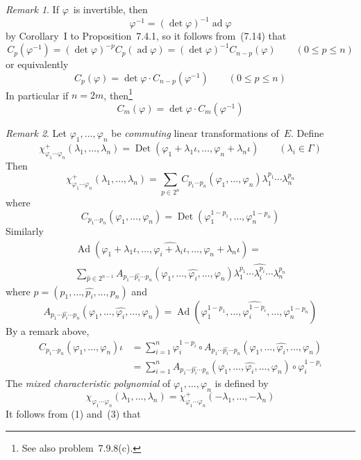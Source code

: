 \documentclass[letterpaper,12pt]{article}
\DeclareMathOperator{\ad}{ad}
\DeclareMathOperator{\Ad}{Ad}
\DeclareMathOperator{\Det}{Det}
\newcommand{\after}{\circ}
\newcommand{\mult}{\cdot}
\newcommand{\delete}{\widehat}
\theoremstyle{definition}
\theoremstyle{remark}
\newtheorem*{rmk}{Remark}
\begin{document}
\begin{rmk}
If \(\varphi\)~is invertible, then
\[\varphi^{-1}=(\det\varphi)^{-1}\ad\varphi\]
by Corollary~I to Proposition~7.4.1, so it follows from~(7.14) that
\[C_p(\varphi^{-1})=(\det\varphi)^{-p}C_p(\ad\varphi)=(\det\varphi)^{-1}C_{n-p}(\varphi)\qquad(0\le p\le n)\]
or equivalently
\[C_p(\varphi)=\det\varphi\mult C_{n-p}(\varphi^{-1})\qquad(0\le p\le n)\]
In particular if \(n=2m\), then\footnote{See also problem~7.9.8(c).}
\[C_m(\varphi)=\det\varphi\mult C_m(\varphi^{-1})\]
\end{rmk}

\begin{rmk}
Let \(\varphi_1,\ldots,\varphi_n\) be \emph{commuting} linear transformations of~\(E\). Define
\[\chi^+_{\varphi_1\cdots\varphi_n}(\lambda_1,\ldots,\lambda_n)=\Det(\varphi_1+\lambda_1\iota,\ldots,\varphi_n+\lambda_n\iota)\qquad(\lambda_i\in\Gamma)\]
Then
\[\chi^+_{\varphi_1\cdots\varphi_n}(\lambda_1,\ldots,\lambda_n)=\sum_{p\in 2^n}C_{p_1\cdots p_n}(\varphi_1,\ldots,\varphi_n)\lambda_1^{p_1}\cdots\lambda_n^{p_n}\tag{1}\]
where
\[C_{p_1\cdots p_n}(\varphi_1,\ldots,\varphi_n)=\Det(\varphi_1^{1-p_1},\ldots,\varphi_n^{1-p_n})\]
Similarly
\begin{multline*}
\Ad(\varphi_1+\lambda_1\iota,\ldots,\delete{\varphi_i+\lambda_i\iota},\ldots,\varphi_n+\lambda_n\iota)=\\
\sum_{\delete{p}\in 2^{n-1}}A_{p_1\cdots\delete{p_i}\cdots p_n}(\varphi_1,\ldots,\delete{\varphi_i},\ldots,\varphi_n)\lambda_1^{p_1}\cdots\delete{\lambda_i^{p_i}}\cdots\lambda_n^{p_n}\tag{2}
\end{multline*}
where \(\delete{p}=(p_1,\ldots,\delete{p_i},\ldots,p_n)\) and
\[A_{p_1\cdots\delete{p_i}\cdots p_n}(\varphi_1,\ldots,\delete{\varphi_i},\ldots,\varphi_n)=\Ad(\varphi_1^{1-p_1},\ldots,\delete{\varphi_i^{1-p_i}},\ldots,\varphi_n^{1-p_n})\]
By a remark above,
\begin{align*}
C_{p_1\cdots p_n}(\varphi_1,\ldots,\varphi_n)\iota&=\sum_{i=1}^n\varphi_i^{1-p_i}\after A_{p_1\cdots\delete{p_i}\cdots p_n}(\varphi_1,\ldots,\delete{\varphi_i},\ldots,\varphi_n)\\
	&=\sum_{i=1}^n A_{p_1\cdots\delete{p_i}\cdots p_n}(\varphi_1,\ldots,\delete{\varphi_i},\ldots,\varphi_n)\after\varphi_i^{1-p_i}\tag{3}
\end{align*}
The \emph{mixed characteristic polynomial} of \(\varphi_1,\ldots,\varphi_n\) is defined by
\[\chi_{\varphi_1\cdots\varphi_n}(\lambda_1,\ldots,\lambda_n)=\chi^+_{\varphi_1\cdots\varphi_n}(-\lambda_1,\ldots,-\lambda_n)\]
It follows from (1) and~(3) that

\end{rmk}
\end{document}
